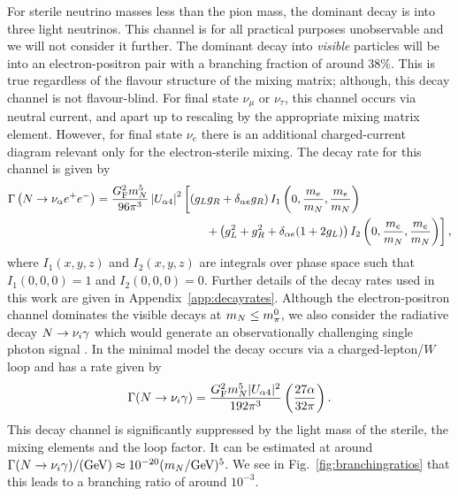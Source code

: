 \documentclass[11pt, a4paper]{article}
\newcommand{\reffig}[1]{Fig.~\ref{#1}}
\newcommand{\refapp}[1]{Appendix~\ref{#1}}
\def\ster{\ensuremath N}
\begin{document}
For sterile neutrino masses less than the pion mass, the dominant decay is into
three light neutrinos. This channel is for all practical purposes unobservable
and we will not consider it further. The dominant decay into \emph{visible}
particles will be into an electron-positron pair with a branching fraction of
around $38\%$. 
%
This is true regardless of the flavour structure of the mixing matrix; 
%
although, this decay channel is not flavour-blind. For final state $\nu_\mu$ or
$\nu_\tau$, this channel occurs via neutral current, and apart up to rescaling
by the appropriate mixing matrix element. However, for final state $\nu_e$
there is an additional charged-current diagram relevant only for the
electron-sterile mixing. The decay rate for this channel is given by 
%
\begin{align*} \Gamma\left(\ster\to \nu_\alpha e^+e^-\right) =
\frac{G_\text{F}^2m_\ster^5}{96\pi^3}\left|U_{\alpha 4}\right|^2&\left[\left(
g_Lg_R + \delta_{\alpha e}g_R\right)I_1\left(0,\frac{m_e}{m_\ster}, \frac{
m_e}{m_\ster}\right)\right.\\ &\left.\qquad + \left(g_L^2 + g_R^2 +
\delta_{\alpha
e}(1+2g_L)\right)I_2\left(0,\frac{m_e}{m_\ster},\frac{m_e}{m_\ster}\right)\right],
\end{align*}
%
where $I_1(x,y,z)$ and $I_2(x,y,z)$ are integrals over phase space such that
$I_1(0,0,0) = 1$ and $I_2(0,0,0) = 0$. Further details of the decay rates used
in this work are given in \refapp{app:decayrates}.
%
%
%
Although the electron-positron channel dominates the visible decays at $m_\ster
\leq m_\pi^0$, we also consider the radiative decay $\ster\to\nu_i\gamma$ which
would generate an observationally challenging single photon signal
\cite{PhysRevD.25.766}. In the minimal model the decay occurs via a
charged-lepton/$W$ loop and has a rate given by
%
\[ \Gamma(\ster\to\nu_i\gamma) = \frac{G_\text{F}^2m_\ster^5 |U_{\alpha
4}|^2}{192 \pi^3} \left( \frac{27 \alpha}{32 \pi} \right). \]
%
This decay channel is significantly suppressed by the light mass of the
sterile, the mixing elements and the loop factor. It can be estimated at around
$\Gamma(\ster\to\nu_i\gamma)/(\text{GeV}) \approx 10^{-20}
(m_\ster/\text{GeV})^5$. We see in \reffig{fig:branchingratios} that this leads
to a branching ratio of around $10^{-3}$.
\end{document}

